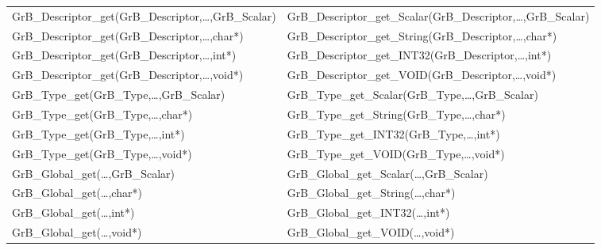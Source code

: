 \begin{table}[htb]
{\begin{tabular}{l|l}
{\sf GrB\_Descriptor\_get(GrB\_Descriptor,\ldots,GrB\_Scalar)}  & {\sf GrB\_Descriptor\_get\_Scalar(GrB\_Descriptor,\ldots,GrB\_Scalar)} \\
{\sf GrB\_Descriptor\_get(GrB\_Descriptor,\ldots,char*)}        & {\sf GrB\_Descriptor\_get\_String(GrB\_Descriptor,\ldots,char*)} \\
{\sf GrB\_Descriptor\_get(GrB\_Descriptor,\ldots,int*)}         & {\sf GrB\_Descriptor\_get\_INT32(GrB\_Descriptor,\ldots,int*)} \\
{\sf GrB\_Descriptor\_get(GrB\_Descriptor,\ldots,void*)}        & {\sf GrB\_Descriptor\_get\_VOID(GrB\_Descriptor,\ldots,void*)} \\
\hline

{\sf GrB\_Type\_get(GrB\_Type,\ldots,GrB\_Scalar)}  & {\sf GrB\_Type\_get\_Scalar(GrB\_Type,\ldots,GrB\_Scalar)} \\
{\sf GrB\_Type\_get(GrB\_Type,\ldots,char*)}        & {\sf GrB\_Type\_get\_String(GrB\_Type,\ldots,char*)} \\
{\sf GrB\_Type\_get(GrB\_Type,\ldots,int*)}         & {\sf GrB\_Type\_get\_INT32(GrB\_Type,\ldots,int*)} \\
{\sf GrB\_Type\_get(GrB\_Type,\ldots,void*)}        & {\sf GrB\_Type\_get\_VOID(GrB\_Type,\ldots,void*)} \\
\hline

{\sf GrB\_Global\_get(\ldots,GrB\_Scalar)}  & {\sf GrB\_Global\_get\_Scalar(\ldots,GrB\_Scalar)} \\
{\sf GrB\_Global\_get(\ldots,char*)}        & {\sf GrB\_Global\_get\_String(\ldots,char*)} \\
{\sf GrB\_Global\_get(\ldots,int*)}         & {\sf GrB\_Global\_get\_INT32(\ldots,int*)} \\
{\sf GrB\_Global\_get(\ldots,void*)}        & {\sf GrB\_Global\_get\_VOID(\ldots,void*)} \\
\hline
\end{tabular}
}
\label{Tab:NonPolymorphic7}
\end{table}



